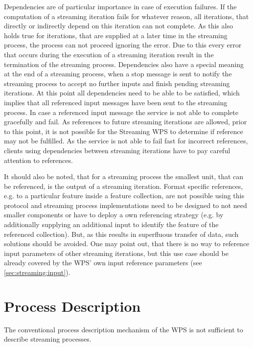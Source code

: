     Dependencies are of particular importance in case of execution failures. If the computation of a streaming iteration fails for whatever reason, all iterations, that directly or indirectly depend on this iteration can not complete. As this also holds true for iterations, that are supplied at a later time in the streaming process, the process can not proceed ignoring the error. Due to this every error that occurs during the execution of a streaming iteration result in the termination of the streaming process.
    Dependencies also have a special meaning at the end of a streaming process, when a stop message is sent to notify the streaming process to accept no further inputs and finish pending streaming iterations. At this point all dependencies need to be able to be satisfied, which implies that all referenced input messages have been sent to the streaming process. In case a referenced input message the service is not able to complete gracefully and fail. As references to future streaming iterations are allowed, prior to this point, it is not possible for the Streaming \ac{WPS} to determine if reference may not be fulfilled. As the service is not able to fail fast for incorrect references, clients using dependencies between streaming iterations have to pay careful attention to references.

    It should also be noted, that for a streaming process the smallest unit, that can be referenced, is the output of a streaming iteration. Format specific references, e.g. to a particular feature inside a feature collection, are not possible using this protocol and streaming process implementations need to be designed to not need smaller components or have to deploy a own referencing strategy (e.g. by additionally supplying an additional input to identify the feature of the referenced collection). But, as this results in superfluous transfer of data, such solutions should be avoided. One may point out, that there is no way to reference input parameters of other streaming iterations, but this use case should be already covered by the \ac{WPS}' own input reference parameters (see \cref{sec:streaming:input}).

  \section{Process Description}
    \label{sec:stream:processdescription}
    The conventional process description mechanism of the \ac{WPS} is not sufficient to describe streaming processes.

